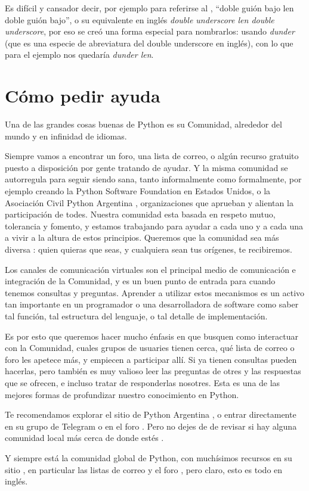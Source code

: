 \begin{info}
Es difícil y cansador decir, por ejemplo para referirse al , ``doble guión bajo len doble guión bajo'', o su equivalente en inglés \textit{double underscore len double underscore}, por eso se creó una forma especial para nombrarlos: usando \textit{dunder} (que es una especie de abreviatura del double underscore en inglés), con lo que para el ejemplo nos quedaría \textit{dunder len}.
\end{info}


\section{Cómo pedir ayuda}

Una de las grandes cosas buenas de Python es su Comunidad, alrededor del mundo y en infinidad de idiomas.

Siempre vamos a encontrar un foro, una lista de correo, o algún recurso gratuito puesto a disposición por gente tratando de ayudar. Y la misma comunidad se autorregula para seguir siendo sana, tanto informalmente como formalmente, por ejemplo creando la Python Software Foundation en Estados Unidos, o la Asociación Civil Python Argentina \cite{asoc_civil_pyar}, organizaciones que aprueban y alientan la participación de todes. Nuestra comunidad esta basada en respeto mutuo, tolerancia y fomento, y estamos trabajando para ayudar a cada uno y a cada una a vivir a la altura de estos principios. Queremos que la comunidad sea más diversa \cite{diversidad}: quien quieras que seas, y cualquiera sean tus orígenes, te recibiremos.

Los canales de comunicación virtuales son el principal medio de comunicación e integración de la Comunidad, y es un buen punto de entrada para cuando tenemos consultas y preguntas. Aprender a utilizar estos mecanismos es un activo tan importante en un programador o una desarrolladora de software como saber tal función, tal estructura del lenguaje, o tal detalle de implementación.

Es por esto que queremos hacer mucho énfasis en que busquen como interactuar con la Comunidad, cuales grupos de usuaries tienen cerca, qué lista de correo o foro les apetece más, y empiecen a participar allí. Si ya tienen consultas pueden hacerlas, pero también es muy valioso leer las preguntas de otres y las respuestas que se ofrecen, e incluso tratar de responderlas nosotres. Esta es una de las mejores formas de profundizar nuestro conocimiento en Python.

Te recomendamos explorar el sitio de Python Argentina \cite{pyar}, o entrar directamente en su grupo de Telegram \cite{pyar_telegram} o en el foro \cite{pyar_foro}. Pero no dejes de de revisar si hay alguna comunidad local más cerca de donde estés \cite{python_lugs}.

Y siempre está la comunidad global de Python, con muchísimos recursos en su sitio \cite{python_org}, en particular las listas de correo \cite{python_lists} y el foro \cite{python_forum}, pero claro, esto es todo en inglés.
